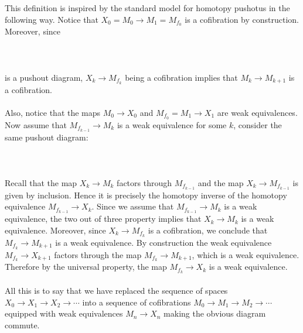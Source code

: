 \documentclass[a4paper]{article}
\begin{document}
This definition is inspired by the standard model for homotopy pushotus in the following way. Notice that $X_0=M_0\to M_1=M_{f_0}$ is a cofibration by construction. Moreover, since \\~\\
\\~\\
is a pushout diagram, $X_k\to M_{f_k}$ being a cofibration implies that $M_k\to M_{k+1}$ is a cofibration. \\~\\

Also, notice that the maps $M_0\to X_0$ and $M_{f_0}=M_1\to X_1$ are weak equivalences. Now assume that $M_{f_{k-1}}\to M_k$ is a weak equivalence for some $k$, consider the same pushout diagram: \\~\\
\\~\\
Recall that the map $X_k\to M_k$ factors through $M_{f_{k-1}}$ and the map $X_k\to M_{f_{k-1}}$ is given by inclusion. Hence it is precisely the homotopy inverse of the homotopy equivalence $M_{f_{k-1}}\to X_k$. Since we assume that $M_{f_{k-1}}\to M_k$ is a weak equivalence, the two out of three property implies that $X_k\to M_k$ is a weak equivalence. Moreover, since $X_k\to M_{f_k}$ is a cofibration, we conclude that $M_{f_k}\to M_{k+1}$ is a weak equivalence. By construction the weak equivalence $M_{f_k}\to X_{k+1}$ factors through the map $M_{f_k}\to M_{k+1}$, which is a weak equivalence. Therefore by the universal property, the map $M_{f_k}\to X_k$ is a weak equivalence. \\~\\

All this is to say that we have replaced the sequence of spaces $X_0\to X_1\to X_2\to\cdots$ into a sequence of cofibrations $M_0\to M_1\to M_2\to\cdots$ equipped with weak equivalences $M_n\to X_n$ making the obvious diagram commute. 
\end{document}
